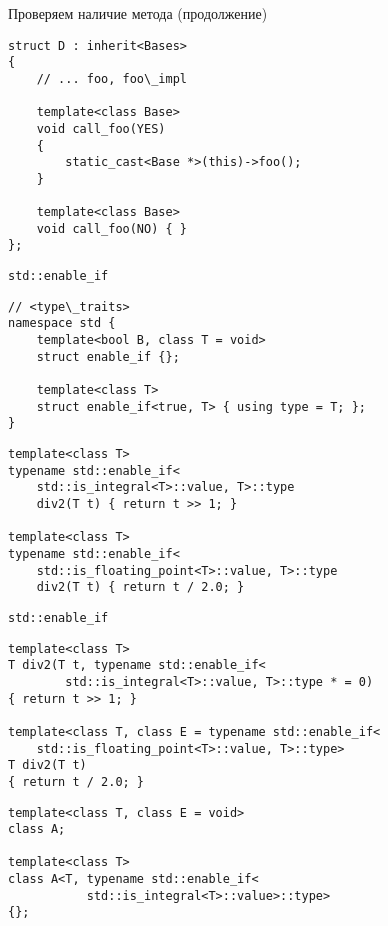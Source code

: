 \documentclass[aspectration=1610,t]{beamer}
\begin{document}
\begin{frame}[fragile]{Проверяем наличие метода (продолжение)}
\begin{lstlisting}
struct D : inherit<Bases> 
{
    // ... foo, foo\_impl

    template<class Base>
    void call_foo(YES) 
    { 
        static_cast<Base *>(this)->foo();
    }

    template<class Base>
    void call_foo(NO) { }
};

\end{lstlisting}
\end{frame}

\begin{frame}[fragile]{{\tt std::enable\_if}}
\begin{lstlisting}
// <type\_traits>
namespace std {
    template<bool B, class T = void> 
    struct enable_if {};
 
    template<class T>
    struct enable_if<true, T> { using type = T; };
}
\end{lstlisting}
\begin{lstlisting}
template<class T>
typename std::enable_if<
    std::is_integral<T>::value, T>::type
    div2(T t) { return t >> 1; }
 
template<class T>
typename std::enable_if<
    std::is_floating_point<T>::value, T>::type
    div2(T t) { return t / 2.0; }
\end{lstlisting}
\end{frame}

\begin{frame}[fragile]{{\tt std::enable\_if}}
\begin{lstlisting}
template<class T>
T div2(T t, typename std::enable_if<
        std::is_integral<T>::value, T>::type * = 0)
{ return t >> 1; }

template<class T, class E = typename std::enable_if<
    std::is_floating_point<T>::value, T>::type>
T div2(T t) 
{ return t / 2.0; }
\end{lstlisting}

\begin{lstlisting}
template<class T, class E = void> 
class A; 
 
template<class T>
class A<T, typename std::enable_if<
           std::is_integral<T>::value>::type> 
{};
\end{lstlisting}
\end{frame}
\end{document}
